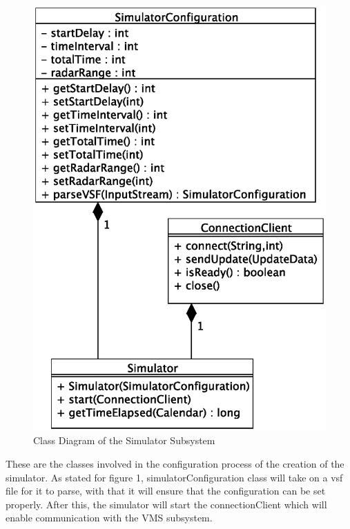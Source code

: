 \documentclass{article}
\begin{document}
\break

\begin{figure}[!htb]
\caption{Class Diagram of the Simulator Subsystem}
\centering
\includegraphics[scale=0.4]{diagrams/simulator-class-diagram.eps}
\end{figure}

These are the classes involved in the configuration process of the creation of the simulator. As stated for figure 1, simulatorConfiguration class will take on a vsf file for it to parse, with that it will ensure that the configuration can be set properly. After this, the simulator will start the connectionClient which will enable communication with the VMS subsystem.
\end{document}
